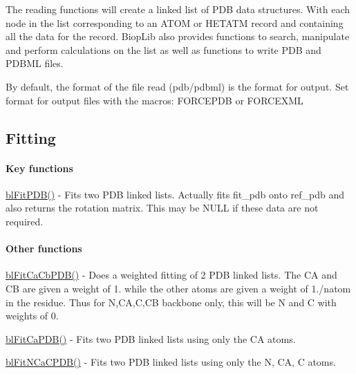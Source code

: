 The reading functions will create a linked list of P\-D\-B data structures. With each node in the list corresponding to an A\-T\-O\-M or H\-E\-T\-A\-T\-M record and containing all the data for the record. Biop\-Lib also provides functions to search, manipulate and perform calculations on the list as well as functions to write P\-D\-B and P\-D\-B\-M\-L files.

By default, the format of the file read (pdb/pdbml) is the format for output. Set format for output files with the macros\-: F\-O\-R\-C\-E\-P\-D\-B or F\-O\-R\-C\-E\-X\-M\-L

\subsection*{Fitting }

\paragraph*{Key functions}


\begin{DoxyItemize}
\item \hyperlink{_fit_p_d_b_8c_a243aa3ef51f227971f3304b48e9841c6}{bl\-Fit\-P\-D\-B()} -\/ Fits two P\-D\-B linked lists. Actually fits fit\-\_\-pdb onto ref\-\_\-pdb and also returns the rotation matrix. This may be N\-U\-L\-L if these data are not required.
\end{DoxyItemize}

\paragraph*{Other functions}


\begin{DoxyItemize}
\item \hyperlink{_fit_ca_cb_p_d_b_8c_a2b00875ef3b9aa1f9f771eaac42e9074}{bl\-Fit\-Ca\-Cb\-P\-D\-B()} -\/ Does a weighted fitting of 2 P\-D\-B linked lists. The C\-A and C\-B are given a weight of 1. while the other atoms are given a weight of 1./natom in the residue. Thus for N,C\-A,C,C\-B backbone only, this will be N and C with weights of 0.
\item \hyperlink{_fit_ca_p_d_b_8c_a59c30ad497d5030a376260e860d1ecec}{bl\-Fit\-Ca\-P\-D\-B()} -\/ Fits two P\-D\-B linked lists using only the C\-A atoms.
\item \hyperlink{_fit_n_ca_c_p_d_b_8c_ad83bbf1040dda7d31cc2b8a662d0c845}{bl\-Fit\-N\-Ca\-C\-P\-D\-B()} -\/ Fits two P\-D\-B linked lists using only the N, C\-A, C atoms.
\end{DoxyItemize}

